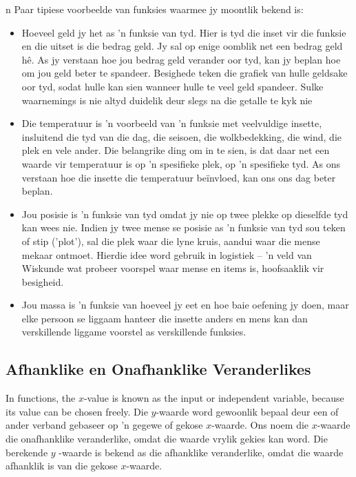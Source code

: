 n Paar tipiese voorbeelde van funksies waarmee jy moontlik bekend is:\par 
\begin{itemize}[noitemsep]
\item Hoeveel geld jy het as ’n funksie van tyd. Hier is tyd die inset vir die funksie en die uitset is die bedrag geld. Jy sal op
enige oomblik net een bedrag geld hê. As jy verstaan hoe jou bedrag geld verander oor tyd, kan jy beplan hoe om jou
geld beter te spandeer. Besighede teken die grafiek van hulle geldsake oor tyd, sodat hulle kan sien wanneer hulle te
veel geld spandeer. Sulke waarnemings is nie altyd duidelik deur slegs na die getalle te kyk nie
\item Die temperatuur is ’n voorbeeld van ’n funksie met veelvuldige insette, insluitend die tyd van die dag, die seisoen, die
wolkbedekking, die wind, die plek en vele ander. Die belangrike ding om in te sien, is dat daar net een waarde vir
temperatuur is op ’n spesifieke plek, op ’n spesifieke tyd. As ons verstaan hoe die insette die temperatuur beïnvloed,
kan ons ons dag beter beplan.
\item Jou posisie is ’n funksie van tyd omdat jy nie op twee plekke op dieselfde tyd kan wees nie. Indien jy twee mense se
posisie as ’n funksie van tyd sou teken of stip (’plot’), sal die plek waar die lyne kruis, aandui waar die mense mekaar
ontmoet. Hierdie idee word gebruik in logistiek – ’n veld van Wiskunde wat probeer voorspel waar mense en items is,
hoofsaaklik vir besigheid.
\item Jou massa is ’n funksie van hoeveel jy eet en hoe baie oefening jy doen, maar elke persoon se liggaam hanteer die
insette anders en mens kan dan verskillende liggame voorstel as verskillende funksies.
\end{itemize}





\subsection*{Afhanklike en Onafhanklike Veranderlikes}
In functions, the $x$-value is known as the input or independent variable, because its value can be chosen freely. Die $y$-waarde
word gewoonlik bepaal deur een of ander verband gebaseer op ’n gegewe of gekose $x$-waarde. Ons noem die $x$-waarde die onafhanklike veranderlike, omdat die waarde vrylik gekies kan word. Die berekende $y$ -waarde is bekend as die afhanklike veranderlike, omdat die waarde afhanklik is van die gekose $x$-waarde.\par 

